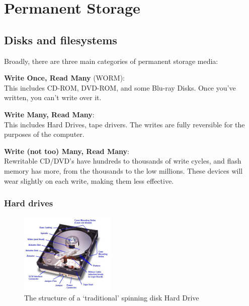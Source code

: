\section{Permanent Storage}

\subsection{Disks and filesystems}

Broadly, there are three main categories of permanent storage media:

\begin{description}
  \item \textbf{Write Once, Read Many} (WORM):\\
    This includes CD-ROM, DVD-ROM, and some Blu-ray Disks. Once you've written,
    you can't write over it.
  \item \textbf{Write Many, Read Many}:\\
    This includes Hard Drives, tape drivers. The writes are fully reversible for
    the purposes of the computer. 
  \item \textbf{Write (not too) Many, Read Many}:\\
    Rewritable CD/DVD's have hundreds to thousands of write cycles, and flash
    memory has more, from the thousands to the low millions. These devices will
    wear slightly on each write, making them less effective.
\end{description}

\subsubsection{Hard drives}

\begin{figure}
  \centering
  \includegraphics[width=0.4\textwidth]{images/hard-drive}
  \caption{The structure of a `traditional' spinning disk Hard Drive}
  \label{hard-drive}
\end{figure}


